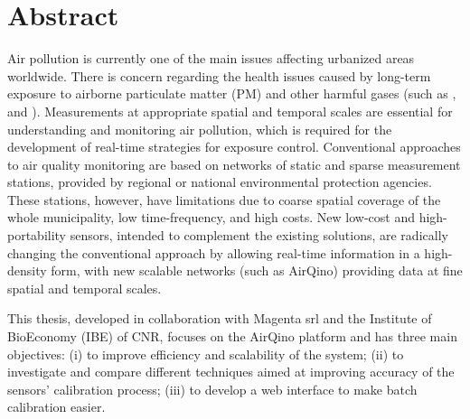\chapter{Abstract}\label{ch:abstract}

Air pollution is currently one of the main issues affecting urbanized areas worldwide. There is concern regarding the health issues caused by long-term exposure to airborne particulate matter (PM) and other harmful gases (such as ,  and ). Measurements at appropriate spatial and temporal scales are essential for understanding and monitoring air pollution, which is required for the development of real-time strategies for exposure control. 
Conventional approaches to air quality monitoring are based on networks of static and sparse measurement stations, provided by regional or national environmental protection agencies. 
These stations, however, have limitations due to coarse spatial coverage of the whole municipality, low time-frequency, and high costs. 
New low-cost and high-portability sensors, intended to complement the existing solutions, are radically changing the conventional approach by allowing real-time information in a high-density form, with new scalable networks (such as AirQino) providing data at fine spatial and temporal scales.

This thesis, developed in collaboration with Magenta srl and the Institute of BioEconomy (IBE) of CNR, focuses on the AirQino platform and has three main objectives: (i) to improve efficiency and scalability of the system; (ii) to investigate and compare different techniques aimed at improving accuracy of the sensors' calibration process; (iii) to develop a web interface to make batch calibration easier.